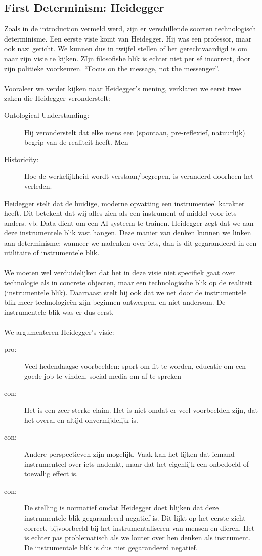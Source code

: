 \documentclass[../summary.tex]{subfiles}
\begin{document}
	\subsection{First Determinism: Heidegger}
	Zoals in de introduction vermeld werd, zijn er verschillende soorten technologisch determinisme. Een eerste visie komt van Heidegger. Hij was een professor, maar ook nazi gericht. We kunnen dus in twijfel stellen of het gerechtvaardigd is om naar zijn visie te kijken. ZIjn filosofishe blik is echter niet per sé incorrect, door zijn politieke voorkeuren. ``Focus on the message, not the messenger''. \\
	\\
	Vooraleer we verder kijken naar Heidegger's mening, verklaren we eerst twee zaken die Heidegger veronderstelt:
	\begin{description}
		\item[Ontological Understanding: ] Hij veronderstelt dat elke mens een (spontaan, pre-reflexief, natuurlijk) begrip van de realiteit heeft. Men
		\item[Historicity: ] Hoe de werkelijkheid wordt verstaan/begrepen, is veranderd doorheen het verleden.
	\end{description}
	Heidegger stelt dat de huidige, moderne opvatting een instrumenteel karakter heeft. Dit betekent dat wij alles zien als een instrument of middel voor iets anders. vb. Data dient om een AI-systeem te trainen. Heidegger zegt dat we aan deze instrumentele blik vast hangen. Deze manier van denken kunnen we linken aan determinisme: wanneer we nadenken over iets, dan is dit gegarandeerd in een utilitaire of instrumentele blik.\\
	\\
	We moeten wel verduidelijken dat het in deze visie niet specifiek gaat over technologie als in concrete objecten, maar een technologische blik op de realiteit (instrumentele blik). Daarnaast stelt hij ook dat we net door de instrumentele blik meer technologieën zijn beginnen ontwerpen, en niet andersom. De instrumentele blik was er dus eerst. \\
	\\
	We argumenteren Heidegger's visie:
	\begin{description}
		\item[pro:] Veel hedendaagse voorbeelden: sport om fit te worden, educatie om een goede job te vinden, social media om af te spreken
		\item[con:] Het is een zeer sterke claim. Het is niet omdat er veel voorbeelden zijn, dat het overal en altijd onvermijdelijk is.
		\item[con:] Andere perspectieven zijn mogelijk. Vaak kan het lijken dat iemand instrumenteel over iets nadenkt, maar dat het eigenlijk een onbedoeld of toevallig effect is.
		\item[con:] De stelling is normatief omdat Heidegger doet blijken dat deze instrumentele blik gegarandeerd negatief is. Dit lijkt op het eerste zicht correct, bijvoorbeeld bij het instrumentaliseren van mensen en dieren. Het is echter pas problematisch als we louter over hen denken als instrument. De instrumentale blik is dus niet gegarandeerd negatief.
	\end{description}
	
\end{document}
